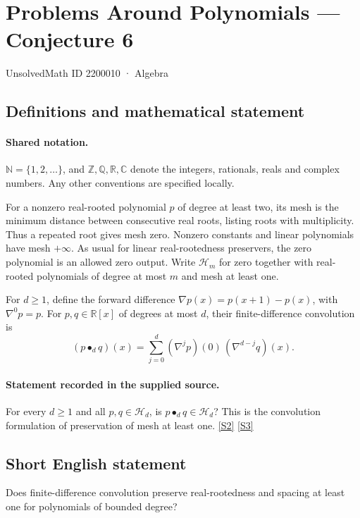 \documentclass[11pt]{article}
\newcommand{\sref}[2]{\hyperlink{source:#1:#2}{[S#2]}}
\begin{document}
\setcounter{section}{2200009}
\section{Problems Around Polynomials — Conjecture 6}\label{2200010}
{\small\sffamily UnsolvedMath ID 2200010 · Algebra}
\subsection{Definitions and mathematical statement}

\paragraph{Shared notation.}$\mathbb N=\{1,2,\ldots\}$, and $\mathbb Z,\mathbb Q,\mathbb R,\mathbb C$ denote the integers, rationals, reals and complex numbers. Any other conventions are specified locally.


For a nonzero real-rooted polynomial $p$ of degree at least two, its mesh is the minimum distance between consecutive real roots, listing roots with multiplicity. Thus a repeated root gives mesh zero. Nonzero constants and linear polynomials have mesh $+\infty$. As usual for linear real-rootedness preservers, the zero polynomial is an allowed zero output. Write $\mathcal H_m$ for zero together with real-rooted polynomials of degree at most $m$ and mesh at least one.\par For $d\geq1$, define the forward difference $\nabla p(x)=p(x+1)-p(x)$, with $\nabla^0p=p$. For $p,q\in\mathbb R[x]$ of degrees at most $d$, their finite-difference convolution is
\[(p\bullet_d q)(x)=\sum_{j=0}^{d}(\nabla^jp)(0)\,(\nabla^{d-j}q)(x).\]
\paragraph{Statement recorded in the supplied source.}
For every $d\geq1$ and all $p,q\in\mathcal H_d$, is $p\bullet_d q\in\mathcal H_d$? This is the convolution formulation of preservation of mesh at least one. \sref{2200010}{2} \sref{2200010}{3}
\subsection{Short English statement}
Does finite-difference convolution preserve real-rootedness and spacing at least one for polynomials of bounded degree?
\end{document}
